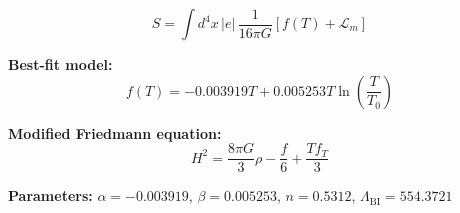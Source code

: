 
\begin{equation}
  S = \int d^4x \, |e| \, \frac{1}{16\pi G} \left[ f(T) + \mathcal{L}_m \right]
\end{equation}

\textbf{Best-fit model:}
\begin{equation}
  f(T) = -0.003919 T + 0.005253 T \ln\!\left(\frac{T}{T_0}\right)
\end{equation}

\textbf{Modified Friedmann equation:}
\begin{equation}
  H^2 = \frac{8\pi G}{3} \rho - \frac{f}{6} + \frac{T f_T}{3}
\end{equation}

\textbf{Parameters:}
$\alpha = -0.003919$, \quad
$\beta = 0.005253$, \quad
$n = 0.5312$, \quad
$\Lambda_{\text{BI}} = 554.3721$